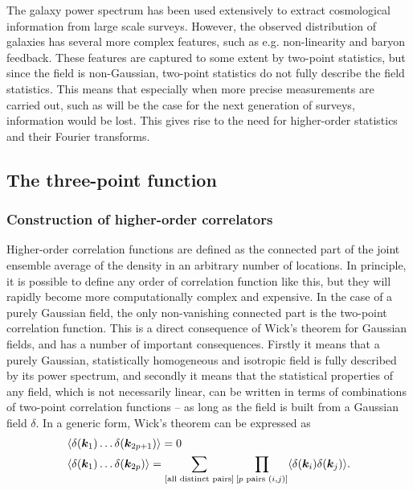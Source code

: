 The galaxy power spectrum has been used extensively to extract cosmological information from large scale surveys. However, the observed distribution of galaxies has several more complex features, such as e.g. non-linearity and baryon feedback. These features are captured to some extent by two-point statistics, but since the field is non-Gaussian, two-point statistics do not fully describe the field statistics. This means that especially when more precise measurements are carried out, such as will be the case for the next generation of surveys, information would be lost. This gives rise to the need for higher-order statistics and their Fourier transforms. 

\subsection{The three-point function}

\subsubsection{Construction of higher-order correlators}

Higher-order correlation functions are defined as the connected part of the joint ensemble average of the density in an arbitrary number of locations. In principle, it is possible to define any order of correlation function like this, but they will rapidly become more computationally complex and expensive. In the case of a purely Gaussian field, the only non-vanishing connected part is the two-point correlation function. This is a direct consequence of Wick's theorem for Gaussian fields, and has a number of important consequences. Firstly it means that a purely Gaussian, statistically homogeneous and isotropic field is fully described by its power spectrum, and secondly it means that the statistical properties of any field, which is not necessarily linear, can be written in terms of combinations of two-point correlation functions -- as long as the field is built from a Gaussian field $\delta$. In a generic form, Wick's theorem can be expressed as 
\begin{align}
	&\langle \delta(\bm {k}_1) \ldots \delta(\bm{k}_{2p + 1}) \rangle = 0 \nonumber \\
	&\langle \delta(\bm {k}_1) \ldots \delta(\bm{k}_{2p})\rangle = \sum_{[\text{all distinct pairs}]} \prod_{[p \text{ pairs } (i,j)]} \langle \delta(\bm{k}_i) \delta(\bm{k}_j) \rangle.  
\end{align}

